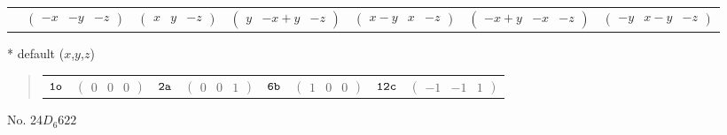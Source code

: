 \documentclass[fleqn,9pt,landscape]{jsarticle}
\begin{document}
\begin{center}
\begin{longtable}{ccccccc}
& $ \begin{pmatrix} - x & - y & - z \end{pmatrix} $ & $ \begin{pmatrix} x & y & - z \end{pmatrix} $ & $ \begin{pmatrix} y & - x + y & - z \end{pmatrix} $ & $ \begin{pmatrix} x - y & x & - z \end{pmatrix} $ & $ \begin{pmatrix} - x + y & - x & - z \end{pmatrix} $ & $ \begin{pmatrix} - y & x - y & - z \end{pmatrix} $ \\
\end{longtable}
\end{center}
* default ($x$,$y$,$z$)
\begin{quote}
\begin{tabular}{cccccccc}
$ {\tt 1o} $ & $ \begin{pmatrix} 0 & 0 & 0 \end{pmatrix} $ & $ {\tt 2a} $ & $ \begin{pmatrix} 0 & 0 & 1 \end{pmatrix} $ & $ {\tt 6b} $ & $ \begin{pmatrix} 1 & 0 & 0 \end{pmatrix} $ & $ {\tt 12c} $ & $ \begin{pmatrix} -1 & -1 & 1 \end{pmatrix} $
\end{tabular}
\end{quote}
\newpage
No. 24\quad$D_{6}$\quad$622$\quad[ hexagonal ]
\end{document}
